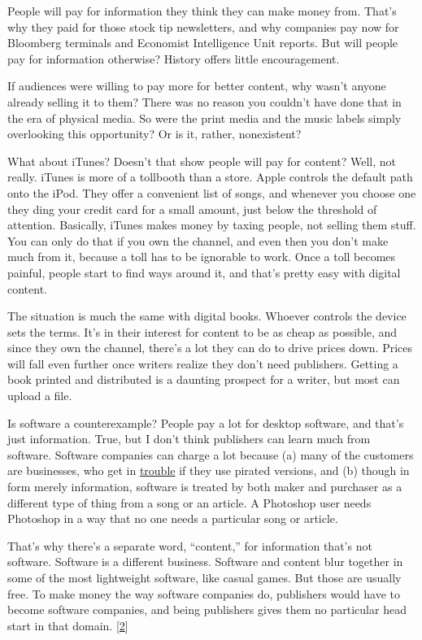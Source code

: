 People will pay for information they think they can make money from.
That's why they paid for those stock tip newsletters, and why companies
pay now for Bloomberg terminals and Economist Intelligence Unit reports.
But will people pay for information otherwise? History offers little
encouragement.

If audiences were willing to pay more for better content, why wasn't
anyone already selling it to them? There was no reason you couldn't have
done that in the era of physical media. So were the print media and the
music labels simply overlooking this opportunity? Or is it, rather,
nonexistent?

What about iTunes? Doesn't that show people will pay for content? Well,
not really. iTunes is more of a tollbooth than a store. Apple controls
the default path onto the iPod. They offer a convenient list of songs,
and whenever you choose one they ding your credit card for a small
amount, just below the threshold of attention. Basically, iTunes makes
money by taxing people, not selling them stuff. You can only do that if
you own the channel, and even then you don't make much from it, because
a toll has to be ignorable to work. Once a toll becomes painful, people
start to find ways around it, and that's pretty easy with digital
content.

The situation is much the same with digital books. Whoever controls the
device sets the terms. It's in their interest for content to be as cheap
as possible, and since they own the channel, there's a lot they can do
to drive prices down. Prices will fall even further once writers realize
they don't need publishers. Getting a book printed and distributed is a
daunting prospect for a writer, but most can upload a file.

Is software a counterexample? People pay a lot for desktop software, and
that's just information. True, but I don't think publishers can learn
much from software. Software companies can charge a lot because (a) many
of the customers are businesses, who get in
\href{http://www.bsa.org/country/News\%20and\%20Events/News\%20Archives/en/2009/en-08312009-mueller.aspx?sc_lang=en}{trouble}
if they use pirated versions, and (b) though in form merely information,
software is treated by both maker and purchaser as a different type of
thing from a song or an article. A Photoshop user needs Photoshop in a
way that no one needs a particular song or article.

That's why there's a separate word, ``content,'' for information that's
not software. Software is a different business. Software and content
blur together in some of the most lightweight software, like casual
games. But those are usually free. To make money the way software
companies do, publishers would have to become software companies, and
being publishers gives them no particular head start in that domain.
{[}\hyperref[f2n]{2}{]}

